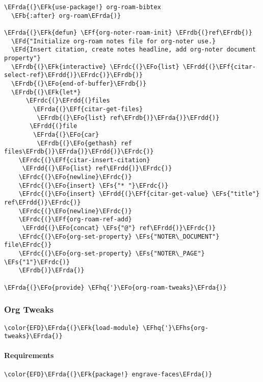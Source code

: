 \documentclass[a4wide,10pt]{article}
\newcommand{\EFs}[1]{\textcolor{EFs}{#1}} %
\newcommand{\EFd}[1]{\textcolor{EFd}{#1}} %
\newcommand{\EFk}[1]{\textcolor{EFk}{#1}} %
\newcommand{\EFb}[1]{\textcolor{EFb}{#1}} %
\newcommand{\EFf}[1]{\textcolor{EFf}{#1}} %
\newcommand{\EFo}[1]{\textcolor{EFo}{#1}} %
\newcommand{\EFhq}[1]{\textcolor{EFhq}{#1}} %
\newcommand{\EFhs}[1]{\textcolor{EFhs}{#1}} %
\newcommand{\EFrda}[1]{\textcolor{EFrda}{#1}} %
\newcommand{\EFrdb}[1]{\textcolor{EFrdb}{#1}} %
\newcommand{\EFrdc}[1]{\textcolor{EFrdc}{#1}} %
\newcommand{\EFrdd}[1]{\textcolor{EFrdd}{#1}} %
\begin{document}
\begin{Code}
\begin{Verbatim}
\EFrda{(}\EFk{use-package!} org-roam-bibtex
  \EFb{:after} org-roam\EFrda{)}

\EFrda{(}\EFk{defun} \EFf{org-noter-roam-init} \EFrdb{(}ref\EFrdb{)}
  \EFd{"Initialize org-roam notes file for org-noter use.}
  \EFd{Insert citation, create notes headline, add org-noter document property"}
  \EFrdb{(}\EFk{interactive} \EFrdc{(}\EFo{list} \EFrdd{(}\EFf{citar-select-ref}\EFrdd{)}\EFrdc{)}\EFrdb{)}
  \EFrdb{(}\EFo{end-of-buffer}\EFrdb{)}
  \EFrdb{(}\EFk{let*}
      \EFrdc{(}\EFrdd{(}files
        \EFrda{(}\EFf{citar-get-files}
         \EFrdb{(}\EFo{list} ref\EFrdb{)}\EFrda{)}\EFrdd{)}
       \EFrdd{(}file
        \EFrda{(}\EFo{car}
         \EFrdb{(}\EFo{gethash} ref files\EFrdb{)}\EFrda{)}\EFrdd{)}\EFrdc{)}
    \EFrdc{(}\EFf{citar-insert-citation}
     \EFrdd{(}\EFo{list} ref\EFrdd{)}\EFrdc{)}
    \EFrdc{(}\EFo{newline}\EFrdc{)}
    \EFrdc{(}\EFo{insert} \EFs{"* "}\EFrdc{)}
    \EFrdc{(}\EFo{insert} \EFrdd{(}\EFf{citar-get-value} \EFs{"title"} ref\EFrdd{)}\EFrdc{)}
    \EFrdc{(}\EFo{newline}\EFrdc{)}
    \EFrdc{(}\EFf{org-roam-ref-add}
     \EFrdd{(}\EFo{concat} \EFs{"@"} ref\EFrdd{)}\EFrdc{)}
    \EFrdc{(}\EFo{org-set-property} \EFs{"NOTER\_DOCUMENT"} file\EFrdc{)}
    \EFrdc{(}\EFo{org-set-property} \EFs{"NOTER\_PAGE"} \EFs{"1"}\EFrdc{)}
    \EFrdb{)}\EFrda{)}

\EFrda{(}\EFo{provide} \EFhq{'}\EFo{org-roam-tweaks}\EFrda{)}
\end{Verbatim}
\end{Code}
\subsubsection{Org Tweaks}
\label{sec:org979bdf2}
\begin{Code}
\begin{Verbatim}
\color{EFD}\EFrda{(}\EFk{load-module} \EFhq{'}\EFhs{org-tweaks}\EFrda{)}
\end{Verbatim}
\end{Code}
\paragraph{Requirements}
\label{sec:org80773e1}
\begin{Code}
\begin{Verbatim}
\color{EFD}\EFrda{(}\EFk{package!} engrave-faces\EFrda{)}
\end{Verbatim}
\end{Code}
\end{document}
